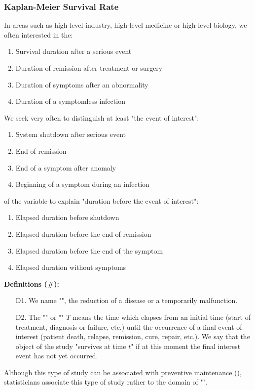 	\subsubsection{Kaplan-Meier Survival Rate}
	In areas such as high-level industry, high-level medicine or high-level biology, we often interested in the:
	\begin{enumerate}
		\item Survival duration after a serious event
		\item Duration of remission after treatment or surgery
		\item Duration of symptoms after an abnormality
		\item Duration of a symptomless infection
	\end{enumerate}
	We seek very often to distinguish at least "the event of interest":
	\begin{enumerate}
		\item System shutdown after serious event
		\item End of remission 
		\item End of a symptom after anomaly
		\item Beginning of a symptom during an infection
	\end{enumerate}
	of the variable to explain "duration before the event of interest":
	\begin{enumerate}
		\item Elapsed duration before shutdown
		\item Elapsed duration before the end of remission
		\item Elapsed duration before the end of the symptom
		\item Elapsed duration without symptoms
	\end{enumerate}
	\textbf{Definitions (\#\mydef):}
	\begin{enumerate}
		\item[D1.] We name "", the reduction of a disease or a temporarily malfunction.
		
		\item[D2.] The "" or "" $T$ means the time which elapses from an initial time (start of treatment, diagnosis or failure, etc.) until the occurrence of a final event of interest (patient death, relapse, remission, cure, repair, etc.). We say that the object of the study "survives at time $t$" if at this moment the final interest event has not yet occurred.
	\end{enumerate}
	\begin{tcolorbox}[title=Remark,colframe=black,arc=10pt]
	Although this type of study can be associated with preventive maintenance (), statisticians associate this type of study rather to the domain of "".
	\end{tcolorbox}
	
